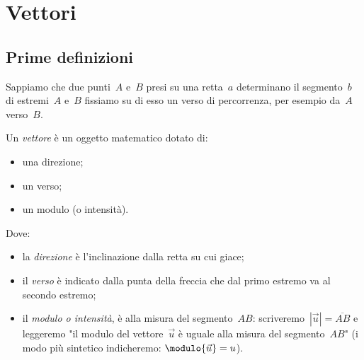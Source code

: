 


\chapter{Vettori}

\section{Prime definizioni}
\label{sec:vett_primedefinizioni}

% 

Sappiamo che due punti~\(A\) e~\(B\) presi su una retta~\(a\) determinano il 
segmento~\(b\) di estremi~\(A\) e~\(B\) fissiamo su di esso un verso di percorrenza, 
per esempio da~\(A\) verso~\(B\).

\begin{definizione}
Un \emph{vettore} è un oggetto matematico dotato di:

\begin{minipage}{.39 \textwidth}
\begin{itemize}
 \item una direzione;
 \item un verso;
 \item un modulo (o intensità).
\end{itemize}
\end{minipage}
\hfill
\begin{minipage}{.59 \textwidth}
 \begin{inaccessibleblock}
 \begin{center}
  \vettoredef
 \end{center}
\end{inaccessibleblock}
\end{minipage}
\end{definizione}

Dove:
\begin{itemize} [nosep]
\item la \emph{direzione} è l'inclinazione dalla retta su cui giace;
\item il \emph{verso} è indicato dalla punta della freccia che dal primo 
estremo va al secondo estremo;
\item il \emph{modulo o intensità}, è alla misura del segmento~\(AB\): 
scriveremo~\(|\vec{u}|=\overline{AB}\) e leggeremo "il modulo del 
vettore~\(\vec{u}\) è uguale alla misura del segmento~\(AB\)"
(i modo più sintetico indicheremo: \(\modulo{\vec{u}} = u\)).
\end{itemize}

